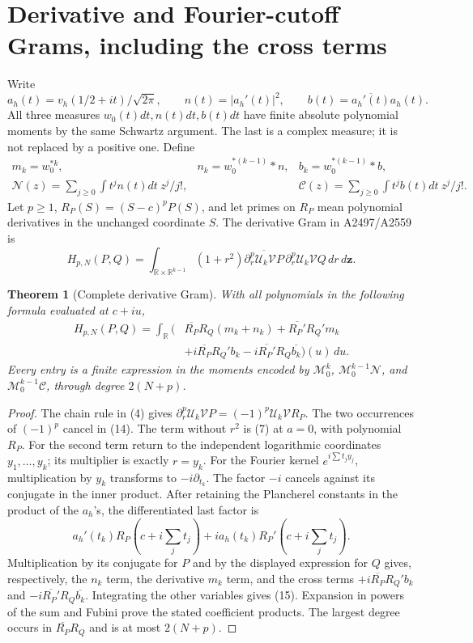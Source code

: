 \documentclass[11pt]{article}
\newtheorem{theorem}{Theorem}
\newcommand{\V}{\mathcal V}
\begin{document}
\section{Derivative and Fourier-cutoff Grams, including the cross terms}
Write
\[
 a_h(t)=v_h(1/2+it)/\sqrt{2\pi},\qquad
 n(t)=|a_h'(t)|^2,\qquad
 b(t)=\overline{a_h'(t)}a_h(t).
 \tag{12}
\]
All three measures \(w_0(t)dt,n(t)dt,b(t)dt\) have finite absolute
polynomial moments by the same Schwartz argument. The last is a
complex measure; it is not replaced by a positive one. Define
\[
 \begin{array}{lll}
 m_k=w_0^{*k},&n_k=w_0^{*(k-1)}*n,&b_k=w_0^{*(k-1)}*b,\\
 \mathcal N(z)=\sum_{j\ge0}\int t^jn(t)dt\ z^j/j!,&&
 \mathcal C(z)=\sum_{j\ge0}\int t^jb(t)dt\ z^j/j!.
 \end{array}
 \tag{13}
\]
Let \(p\ge1\), \(R_P(S)=(S-c)^pP(S)\), and let primes on
\(R_P\) mean polynomial derivatives in the unchanged coordinate
\(S\). The derivative Gram in A2497/A2559 is
\[
 H_{p,N}(P,Q)=\int_{\mathbb R\times\mathbb R^{k-1}}
 (1+r^2)\overline{\partial_r^p\mathcal U_k\V P}\,
                    \partial_r^p\mathcal U_k\V Q\,dr\,d\mathbf z.
 \tag{14}
\]
\begin{theorem}[Complete derivative Gram]
With all polynomials in the following formula evaluated at \(c+iu\),
\[
 \begin{split}
 H_{p,N}(P,Q)=\int_{\mathbb R}\bigl(&
 \overline{R_P}R_Q(m_k+n_k)
 +\overline{R_P'}R_Q'm_k\\
 &+i\overline{R_P}R_Q'b_k
 -i\overline{R_P'}R_Q\overline{b_k}\bigr)(u)\,du.
 \end{split}
 \tag{15}
\]
Every entry is a finite expression in the moments encoded by
\(\mathcal M_0^k\), \(\mathcal M_0^{k-1}\mathcal N\), and
\(\mathcal M_0^{k-1}\mathcal C\), through degree \(2(N+p)\).
\end{theorem}
\begin{proof}
The chain rule in (4) gives
\(\partial_r^p\mathcal U_k\V P=(-1)^p\mathcal U_k\V R_P\).
The two occurrences of \((-1)^p\) cancel in (14). The term without
\(r^2\) is (7) at \(a=0\), with polynomial \(R_P\).
For the second term return to the independent logarithmic coordinates
\(y_1,\ldots,y_k\); its multiplier is exactly \(r=y_k\).
For the Fourier kernel \(e^{i\sum t_jy_j}\), multiplication by
\(y_k\) transforms to \(-i\partial_{t_k}\). The factor \(-i\)
cancels against its conjugate in the inner product. After retaining
the Plancherel constants in the product of the \(a_h\)'s, the
differentiated last factor is
\[
 a_h'(t_k)R_P(c+i\textstyle\sum_jt_j)
 +i a_h(t_k)R_P'(c+i\textstyle\sum_jt_j).
\]
Multiplication by its conjugate for \(P\) and by the displayed
expression for \(Q\) gives, respectively, the \(n_k\) term, the
derivative \(m_k\) term, and the cross terms
\(+i\overline{R_P}R_Q'b_k\) and
\(-i\overline{R_P'}R_Q\overline{b_k}\). Integrating the other
variables gives (15). Expansion in powers of the sum and Fubini prove
the stated coefficient products. The largest degree occurs in
\(\overline{R_P}R_Q\) and is at most \(2(N+p)\).
\end{proof}
\end{document}
